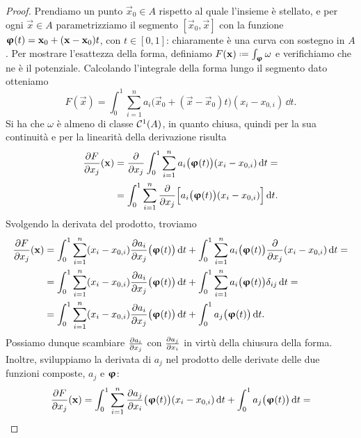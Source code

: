 \begin{proof} Prendiamo un punto $\vec x_0\in A$ rispetto al quale l'insieme è stellato, e per ogni $\vec x\in A$ parametrizziamo il segmento $[\vec x_0,\vec x]$ con la funzione $\bm{\upvarphi}(t)=\mathbf{x}_0+(\mathbf{x}-\mathbf{x}_0)t$, con $t\in[0,1]$: chiaramente è una curva con sostegno in $A$.
	Per mostrare l'esattezza della forma, definiamo $F(\vec x)\defeq\int_{\vphi}\omega$ e verifichiamo che ne è il potenziale.
	Calcolando l'integrale della forma lungo il segmento dato otteniamo
	\begin{equation}
		F(\vec x)=\int_0^1\sum_{i=1}^na_i\big(\vec x_0+(\vec x-\vec x_0)t\big)(x_i-x_{0,i})\,\dd t.
	\end{equation}
	Si ha che $\omega$ è almeno di classe $\mathcal{C}^{{1}}(A)$, in quanto chiusa, quindi per la sua continuità e per la linearità della derivazione risulta
	\begin{equation}
		\begin{split}
			\frac{\partial {F}}{\partial {x_j}}(\mathbf{x})&=\frac{\partial {}}{\partial {x_j}}\int_0^1\sum_{i=1}^na_i\big(\bm{\upvarphi}(t)\big)(x_i-x_{0,i})\,\textup{d} t=\\
			&=\int_0^1\sum_{i=1}^n\frac{\partial {}}{\partial {x_j}}\Big[a_i\big(\bm{\upvarphi}(t)\big)(x_i-x_{0,i})\Big]\,\textup{d} t.
		\end{split}
	\end{equation}
	Svolgendo la derivata del prodotto, troviamo
	\begin{equation}
		\begin{split}
			\frac{\partial {F}}{\partial {x_j}}(\mathbf{x})&=\int_0^1\sum_{i=1}^n(x_i-x_{0,i})\frac{\partial {a_i}}{\partial {x_j}}\big(\bm{\upvarphi}(t)\big)\,\textup{d} t+\int_0^1\sum_{i=1}^na_i\big(\bm{\upvarphi}(t)\big)\frac{\partial {}}{\partial {x_j}}(x_i-x_{0,i})\,\textup{d} t=\\
			&=\int_0^1\sum_{i=1}^n(x_i-x_{0,i})\frac{\partial {a_i}}{\partial {x_j}}\big(\bm{\upvarphi}(t)\big)\,\textup{d} t+\int_0^1\sum_{i=1}^na_i\big(\bm{\upvarphi}(t)\big)\delta_{ij}\,\textup{d} t=\\
			&=\int_0^1\sum_{i=1}^n(x_i-x_{0,i})\frac{\partial {a_i}}{\partial {x_j}}\big(\bm{\upvarphi}(t)\big)\,\textup{d} t+\int_0^1a_j\big(\bm{\upvarphi}(t)\big)\,\textup{d} t.
		\end{split}
	\end{equation}
	Possiamo dunque scambiare $\frac{\partial {a_i}}{\partial {x_j}}$ con $\frac{\partial {a_j}}{\partial {x_i}}$ in virtù della chiusura della forma.
	Inoltre, sviluppiamo la derivata di $a_j$ nel prodotto delle derivate delle due funzioni composte, $a_j$ e $\bm{\upvarphi}$:
	\begin{equation}
		\begin{split}
			\drp{F}{x_j}(\vec x)&=\int_0^1\sum_{i=1}^n\drp{a_j}{x_i}\big(\vphi(t)\big)(x_i-x_{0,i})\,\dd t+\int_0^1a_j\big(\vphi(t)\big)\,\dd t=\\

\end{split}
\end{equation}
\end{proof}
